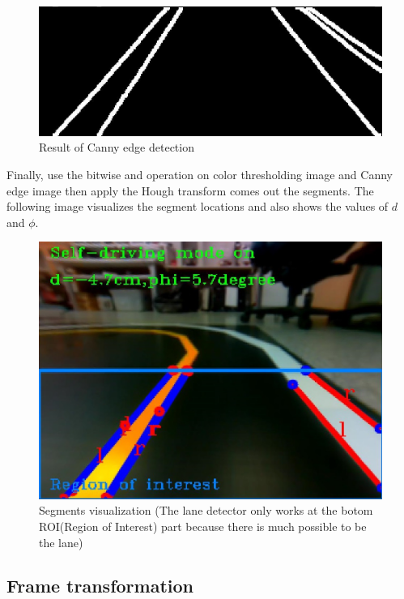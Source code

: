 \documentclass{article}
\begin{document}
\begin{figure}[ht]
  \label{fig:canny}
  \centering
  \includegraphics[scale=0.5]{graphs/canny.jpeg}
  \caption{Result of Canny edge detection}
\end{figure}
\FloatBarrier

\noindent Finally, use the bitwise and operation on color thresholding image and Canny edge image then apply the Hough transform comes out the segments. The following image visualizes the segment locations and also shows the values of $d$ and $\phi$.

\begin{figure}[ht]
  \label{fig:hough}
  \centering
  \includegraphics[scale=0.5]{graphs/lane_mark.jpeg}
  \caption{Segments visualization (The lane detector only works at the botom ROI(Region of Interest) part because there is much possible to be the lane)}
\end{figure}
\FloatBarrier


\subsection{Frame transformation}
\end{document}
